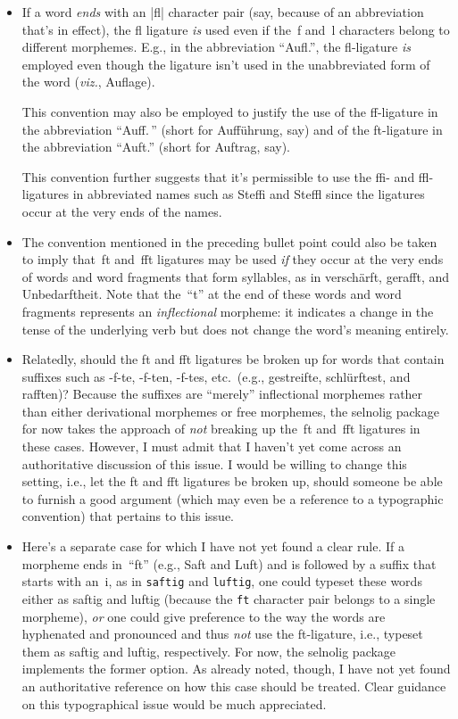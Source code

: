 \documentclass[11pt]{article}
\newcommand{\pkg}[1]{\textsf{#1}}
\newcommand{\opt}[1]{\texttt{#1}}
\begin{document}
\begin{itemize}
\item If a word \emph{ends} with an |fl| character pair (say, because of an abbreviation that's in effect), the fl ligature \emph{is} used even if the~f and~l characters belong to different morphemes. E.g., in the abbreviation \enquote{Aufl.}, the fl-ligature \emph{is} employed even though the ligature isn't used in the unabbreviated form of the word (\emph{viz.}, Auflage).

This convention may also be employed to justify the use of the ff-ligature in the abbreviation \enquote{Auff.\,} (short for Aufführung, say) and of the ft-ligature in the abbreviation \enquote{Auft.} (short for Auftrag, say).

This convention further suggests that it's permissible to use the ffi- and ffl-ligatures in abbreviated names such as Steffi and Steffl since the ligatures occur at the very ends of the names. 

\item The convention mentioned in the preceding bullet point could also be taken to imply that~ft and~fft ligatures may be used {\itshape if} they occur at the very ends of words and word fragments that form syllables, as in verschärft, gerafft, and Unbedarftheit. Note that the~\enquote{t} at the end of these words and word fragments represents an \emph{inflectional} morpheme: it indicates a change in the tense of the underlying verb but does not change the word's meaning entirely.

\item Relatedly, should the ft and fft ligatures be broken up for words that contain suffixes such as -f-te, -f-ten, -f-tes, etc.\ (e.g., gestreifte, schlürftes\breaklig t, and rafften)? Because the suffixes are \enquote{merely} inflectional morphemes rather than either derivational morphemes or free morphemes, the \pkg{selnolig} package for now takes the approach of \emph{not} breaking up the~ft and~fft ligatures in these cases. However, I must admit that I haven't yet come across an authoritative discussion of this issue. I would be willing to change this setting, i.e., let the ft and fft ligatures be broken up, should someone be able to furnish a good argument (which may even be a reference to a typographic convention) that pertains to this issue.


\item Here's a separate case for which I have not yet found a clear rule. If a morpheme ends in~\enquote{ft} (e.g., Saft and Luft) and is followed by a suffix that starts with an~i, as in \opt{saftig} and \opt{luftig}, one could typeset these words either as sa\mbox{ft}ig and lu\mbox{ft}ig (because the \opt{ft} character pair belongs to a single morpheme), \emph{or} one could give preference to the way the words are hyphenated and pronounced and thus \emph{not} use the ft-ligature, i.e., typeset them as saf\breaklig tig and luf\breaklig tig, respectively. For now, the \pkg{selnolig} package implements the former option. As already noted, though, I have not yet found an authoritative reference on how this case should be treated. Clear guidance on this typographical issue would be much appreciated.

\end{itemize}
\end{document}
